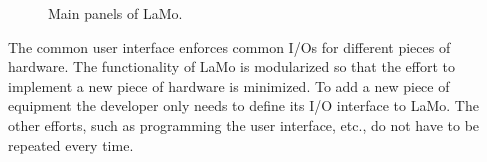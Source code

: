 \begin{figure}[tbhp]
  \caption{Main panels of LaMo.}
  \label{fig:tt:lamo}
\end{figure}

The common user interface enforces common I/Os for different pieces of hardware. The functionality of LaMo is modularized so that the effort to implement a new piece of hardware is minimized. To add a new piece of equipment the developer only needs to define its I/O interface to LaMo. The other efforts, such as programming the user interface, etc., do not have to be repeated every time.


